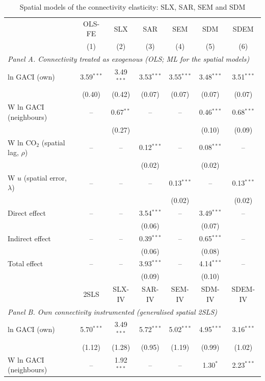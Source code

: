 \begin{table}[htbp]
\centering
\begin{threeparttable}
\caption{Spatial models of the connectivity elasticity: SLX, SAR, SEM and SDM}
\label{tab:spatial}
\footnotesize
\begin{tabular}{lcccccc}
\toprule
 & OLS-FE & SLX & SAR & SEM & SDM & SDEM \\
 & (1) & (2) & (3) & (4) & (5) & (6) \\
\midrule
\multicolumn{7}{l}{\textit{Panel A. Connectivity treated as exogenous (OLS; ML for the spatial models)}} \\
  ln GACI (own) & 3.59$^{***}$ & 3.49$^{***}$ & 3.53$^{***}$ & 3.55$^{***}$ & 3.48$^{***}$ & 3.51$^{***}$ \\
   & (0.40) & (0.42) & (0.07) & (0.07) & (0.07) & (0.07) \\
  W ln GACI (neighbours) & -- & 0.67$^{**}$ & -- & -- & 0.46$^{***}$ & 0.68$^{***}$ \\
   &  & (0.27) &  &  & (0.10) & (0.09) \\
  W ln CO$_2$ (spatial lag, $\rho$) & -- & -- & 0.12$^{***}$ & -- & 0.08$^{***}$ & -- \\
   &  &  & (0.02) &  & (0.02) &  \\
  W $u$ (spatial error, $\lambda$) & -- & -- & -- & 0.13$^{***}$ & -- & 0.13$^{***}$ \\
   &  &  &  & (0.02) &  & (0.02) \\
  Direct effect & -- & -- & 3.54$^{***}$ & -- & 3.49$^{***}$ & -- \\
   &  &  & (0.06) &  & (0.07) &  \\
  Indirect effect & -- & -- & 0.39$^{***}$ & -- & 0.65$^{***}$ & -- \\
   &  &  & (0.06) &  & (0.08) &  \\
  Total effect & -- & -- & 3.93$^{***}$ & -- & 4.14$^{***}$ & -- \\
   &  &  & (0.09) &  & (0.10) &  \\
\midrule
 & 2SLS & SLX-IV & SAR-IV & SEM-IV & SDM-IV & SDEM-IV \\
\midrule
\multicolumn{7}{l}{\textit{Panel B. Own connectivity instrumented (generalised spatial 2SLS)}} \\
  ln GACI (own) & 5.70$^{***}$ & 3.49$^{***}$ & 5.72$^{***}$ & 5.02$^{***}$ & 4.95$^{***}$ & 3.16$^{***}$ \\
   & (1.12) & (1.28) & (0.95) & (1.19) & (0.99) & (1.02) \\
  W ln GACI (neighbours) & -- & 1.92$^{***}$ & -- & -- & 1.30$^{*}$ & 2.23$^{***}$ \\

\end{tabular}
\end{threeparttable}
\end{table}
